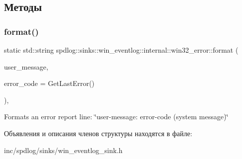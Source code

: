 \subsection{Методы}
\mbox{\label{structspdlog_1_1sinks_1_1win__eventlog_1_1internal_1_1win32__error_ac257bfbcd3a8e7d1be75074b7d41ab6d}} 
\subsubsection{\texorpdfstring{format()}{format()}}
{\footnotesize\ttfamily static std\+::string spdlog\+::sinks\+::win\+\_\+eventlog\+::internal\+::win32\+\_\+error\+::format (\begin{DoxyParamCaption}\item[{std\+::string const \&}]{user\+\_\+message,  }\item[{D\+W\+O\+RD}]{error\+\_\+code = {\ttfamily GetLastError()} }\end{DoxyParamCaption})\hspace{0.3cm}{\ttfamily [inline]}, {\ttfamily [static]}}

Formats an error report line\+: \char`\"{}user-\/message\+: error-\/code (system message)\char`\"{} 

Объявления и описания членов структуры находятся в файле\+:\begin{DoxyCompactItemize}
\item 
inc/spdlog/sinks/win\+\_\+eventlog\+\_\+sink.\+h\end{DoxyCompactItemize}
